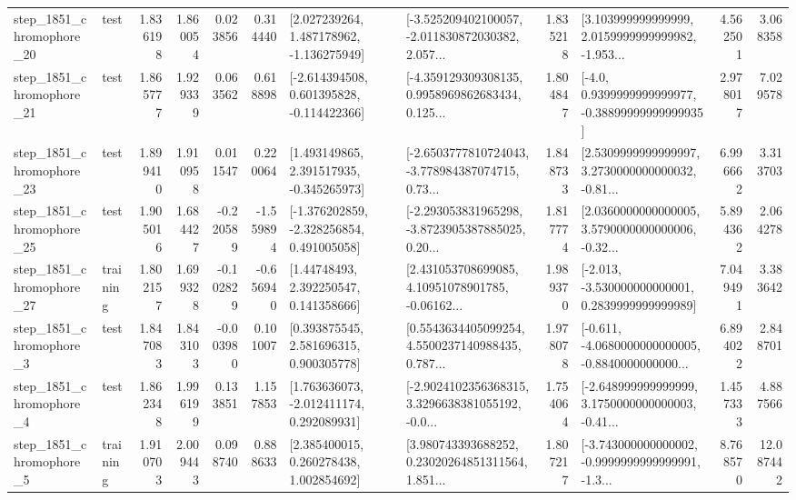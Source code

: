 \begin{tabular}{llrrrrllrlrr}
 step\_1851\_chromophore\_20 &      test &      1.836198 &    1.860054 &      0.023856 &  0.314440 &    [2.027239264, 1.487178962, -1.136275949] &  [-3.525209402100057, -2.011830872030382, 2.057... &       1.835218 &  [3.103999999999999, 2.0159999999999982, -1.953... &            4.562501 &          3.068358 \\
 step\_1851\_chromophore\_21 &      test &      1.865777 &    1.929339 &      0.063562 &  0.618898 &   [-2.614394508, 0.601395828, -0.114422366] &  [-4.359129309308135, 0.9958969862683434, 0.125... &       1.804847 &   [-4.0, 0.9399999999999977, -0.38899999999999935] &            2.978017 &          7.029578 \\
 step\_1851\_chromophore\_23 &      test &      1.899410 &    1.910958 &      0.011547 &  0.220064 &    [1.493149865, 2.391517935, -0.345265973] &  [-2.6503777810724043, -3.778984387074715, 0.73... &       1.848733 &  [2.5309999999999997, 3.2730000000000032, -0.81... &            6.996662 &          3.313703 \\
 step\_1851\_chromophore\_25 &      test &      1.905016 &    1.684427 &     -0.220589 & -1.559894 &   [-1.376202859, -2.328256854, 0.491005058] &  [-2.293053831965298, -3.8723905387885025, 0.20... &       1.817774 &  [2.0360000000000005, 3.5790000000000006, -0.32... &            5.894362 &          2.064278 \\
 step\_1851\_chromophore\_27 &  training &      1.802157 &    1.699328 &     -0.102829 & -0.656940 &      [1.44748493, 2.392250547, 0.141358666] &  [2.431053708699085, 4.10951078901785, -0.06162... &       1.989370 &   [-2.013, -3.530000000000001, 0.2839999999999989] &            7.049491 &          3.383642 \\
  step\_1851\_chromophore\_3 &      test &      1.847083 &    1.843103 &     -0.003980 &  0.101007 &     [0.393875545, 2.581696315, 0.900305778] &  [0.5543634405099254, 4.5500237140988435, 0.787... &       1.978078 &  [-0.611, -4.0680000000000005, -0.8840000000000... &            6.894022 &          2.848701 \\
  step\_1851\_chromophore\_4 &      test &      1.862348 &    1.996199 &      0.133851 &  1.157853 &    [1.763636073, -2.012411174, 0.292089931] &  [-2.9024102356368315, 3.3296638381055192, -0.0... &       1.754064 &  [-2.648999999999999, 3.1750000000000003, -0.41... &            1.457333 &          4.887566 \\
  step\_1851\_chromophore\_5 &  training &      1.910703 &    2.009443 &      0.098740 &  0.888633 &     [2.385400015, 0.260278438, 1.002854692] &  [3.980743393688252, 0.23020264851311564, 1.851... &       1.807217 &  [-3.743000000000002, -0.9999999999999991, -1.3... &            8.768570 &         12.087442 \\

\end{tabular}
